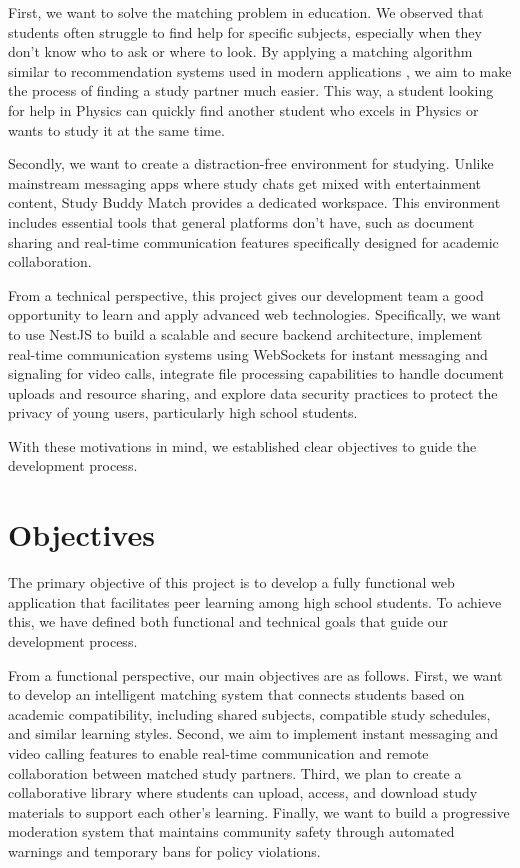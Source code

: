 \documentclass[a4paper,12pt]{report}
\begin{document}
First, we want to solve the matching problem in education. We observed that students often struggle to find help for specific subjects, especially when they don't know who to ask or where to look. By applying a matching algorithm similar to recommendation systems used in modern applications \cite{ricci2011recommender}, we aim to make the process of finding a study partner much easier. This way, a student looking for help in Physics can quickly find another student who excels in Physics or wants to study it at the same time.

Secondly, we want to create a distraction-free environment for studying. Unlike mainstream messaging apps where study chats get mixed with entertainment content, Study Buddy Match provides a dedicated workspace. This environment includes essential tools that general platforms don't have, such as document sharing and real-time communication features specifically designed for academic collaboration.

From a technical perspective, this project gives our development team a good opportunity to learn and apply advanced web technologies. Specifically, we want to use NestJS to build a scalable and secure backend architecture, implement real-time communication systems using WebSockets for instant messaging and signaling for video calls, integrate file processing capabilities to handle document uploads and resource sharing, and explore data security practices to protect the privacy of young users, particularly high school students.

With these motivations in mind, we established clear objectives to guide the development process.

\section{Objectives}

The primary objective of this project is to develop a fully functional web application that facilitates peer learning among high school students. To achieve this, we have defined both functional and technical goals that guide our development process.

From a functional perspective, our main objectives are as follows. First, we want to develop an intelligent matching system that connects students based on academic compatibility, including shared subjects, compatible study schedules, and similar learning styles. Second, we aim to implement instant messaging and video calling features to enable real-time communication and remote collaboration between matched study partners. Third, we plan to create a collaborative library where students can upload, access, and download study materials to support each other's learning. Finally, we want to build a progressive moderation system that maintains community safety through automated warnings and temporary bans for policy violations.
\end{document}
